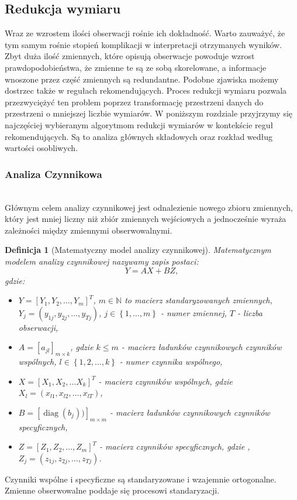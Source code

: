 \documentclass[12pt,a4paper]{report}
\newtheorem{df}{Definicja}[chapter]
\newcommand{\set}[1]{\left\lbrace {#1} \right\rbrace}
\newcommand{\setN}{\mathbb{N}}
\newcommand{\diag}[1]{\operatorname{diag}\left({#1} \right)}
\begin{document}
\subsection{Redukcja wymiaru}
Wraz ze wzrostem ilości obserwacji rośnie ich dokładność. Warto zauważyć, że tym samym rośnie stopień komplikacji w interpretacji otrzymanych wyników. Zbyt duża ilość zmiennych, które opisują obserwacje powoduje wzrost prawdopodobieństwa, że zmienne te są ze sobą skorelowane, a informacje wnoszone przez część zmiennych są redundantne. Podobne zjawiska możemy dostrzec także w regułach rekomendujących. Proces redukcji wymiaru pozwala przezwyciężyć ten problem poprzez transformację przestrzeni danych do przestrzeni o mniejszej liczbie wymiarów. W poniższym rozdziale przyjrzymy się najczęściej wybieranym algorytmom redukcji wymiarów w kontekście reguł rekomendujących. Są to analiza głównych składowych oraz rozkład według wartości osobliwych.

\subsubsection{Analiza Czynnikowa}
{\citep[Sec 11.1]{sadzwpr}}
\\Głównym celem analizy czynnikowej jest odnalezienie nowego zbioru zmiennych, który jest mniej liczny niż zbiór zmiennych wejściowych a jednocześnie wyraża zależności między zmiennymi obserwowalnymi.

\begin{df}[Matematyczny model analizy czynnikowej]
Matematycznym modelem analizy czynnikowej nazywamy zapis postaci:
\begin{equation} 
Y = AX + BZ,
\end{equation} 
gdzie:
\begin{itemize}
\item $Y = [Y_1,Y_2,\ldots ,Y_m]^T$, $m \in \setN $ to macierz standaryzowanych zmiennych, $Y_j=(y_{1j}, y_{2j},\ldots , y_{Tj})$, $j \in \set{1, \ldots , m}$ - numer zmiennej, $T$ - liczba obserwacji,
\item $A = [a_{jl}]_{m \times k}$, gdzie $k \leq m$ - macierz ładunków czynnikowych czynników wspólnych, $l \in \set{1,2, \ldots,k}$ - numer czynnika wspólnego,
\item $X = [X_1, X_2, \ldots X_k]^T$ - macierz czynników wspólnych, gdzie $X_l = (x_{l1}, x_{l2}, \ldots , x_{lT})$,
\item $B = [\diag{b_j})]_{m \times m}$ - macierz ładunków czynnikowych czynników specyficznych,
\item $Z = [Z_1, Z_2, \ldots , Z_m]^T$ - macierz czynników specyficznych, gdzie , $Z_j=(z_{1j}, z_{2j},\ldots , z_{Tj})$.
\end{itemize}
\end{df}
Czynniki wspólne i specyficzne są standaryzowane i wzajemnie ortogonalne. Zmienne obserwowalne poddaje się procesowi standaryzacji.
\end{document}
